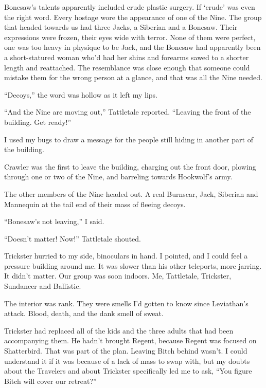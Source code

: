 Bonesaw's talents apparently included crude plastic surgery.  If `crude' was even the right word.  Every hostage wore the appearance of one of the Nine.  The group that headed towards us had three Jacks, a Siberian and a Bonesaw.  Their expressions were frozen, their eyes wide with terror.  None of them were perfect, one was too heavy in physique to be Jack, and the Bonesaw had apparently been a short-statured woman who'd had her shins and forearms sawed to a shorter length and reattached.  The resemblance was close enough that someone could mistake them for the wrong person at a glance, and that was all the Nine needed.



``Decoys,'' the word was hollow as it left my lips.



``And the Nine are moving out,'' Tattletale reported.  ``Leaving the front of the building.  Get ready!''



I used my bugs to draw a message for the people still hiding in another part of the building.



Crawler was the first to leave the building, charging out the front door, plowing through one or two of the Nine, and barreling towards Hookwolf's army.



The other members of the Nine headed out.  A real Burnscar, Jack, Siberian and Mannequin at the tail end of their mass of fleeing decoys.



``Bonesaw's not leaving,'' I said.



``Doesn't matter!  Now!''  Tattletale shouted.



Trickster hurried to my side, binoculars in hand.  I pointed, and I could feel a pressure building around me.  It was slower than his other teleports, more jarring.  It didn't matter.  Our group was soon indoors.  Me, Tattletale, Trickster, Sundancer and Ballistic.



The interior was rank.  They were smells I'd gotten to know since Leviathan's attack.  Blood, death, and the dank smell of sweat.



Trickster had replaced all of the kids and the three adults that had been accompanying them.  He hadn't brought Regent, because Regent was focused on Shatterbird.  That was part of the plan.  Leaving Bitch behind wasn't.  I could understand it if it was because of a lack of mass to swap with, but my doubts about the Travelers and about Trickster specifically led me to ask, ``You figure Bitch will cover our retreat?''



